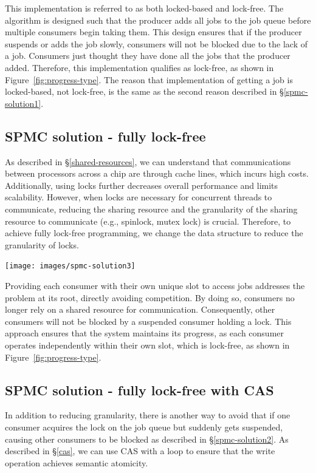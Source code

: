 \documentclass[fontsize=10pt, oneside]{scrartcl}
\newcommand{\fig}[1]{Figure~\ref{#1}}
\newcommand{\secref}[1]{\hyperref[#1]{\textsc{\S}\ref*{#1}}}
\begin{document}
This implementation is referred to as both locked-based and lock-free. 
The algorithm is designed such that the producer adds all jobs to the job queue before multiple consumers begin taking them. 
This design ensures that if the producer suspends or adds the job slowly, 
consumers will not be blocked due to the lack of a job. 
Consumers just thought they have done all the jobs that the producer added.
Therefore, this implementation qualifies as lock-free, as shown in \fig{fig:progress-type}.
The reason that implementation of getting a job is locked-based, not lock-free,  
is the same as the second reason described in \secref{spmc-solution1}.

\subsection{SPMC solution - fully lock-free}
\label{spmc-solution3}
As described in \secref{shared-resources}, 
we can understand that communications between processors across a chip are through cache lines, 
which incurs high costs. Additionally, using locks further decreases overall performance and limits scalability.
However, when locks are necessary for concurrent threads to communicate, 
reducing the sharing resource and the granularity of the sharing resource to communicate (e.g., spinlock, mutex lock) is crucial.
Therefore, to achieve fully lock-free programming, we change the data structure to reduce the granularity of locks.

\texttt{[image: images/spmc-solution3]}
\label{fig:spmc-solution3}

Providing each consumer with their own unique slot to access jobs addresses the problem at its root, 
directly avoiding competition. 
By doing so, consumers no longer rely on a shared resource for communication.
Consequently, other consumers will not be blocked by a suspended consumer holding a lock.
This approach ensures that the system maintains its progress, 
as each consumer operates independently within their own slot, 
which is lock-free, as shown in \fig{fig:progress-type}.

\subsection{SPMC solution - fully lock-free with CAS}
\label{SPMC-solution4}
In addition to reducing granularity, 
there is another way to avoid that if one consumer acquires the lock on the job queue but suddenly gets suspended, 
causing other consumers to be blocked as described in \secref{spmc-solution2}. 
As described in \secref{cas}, we can use \textsc{CAS} with a loop to ensure that the write operation achieves semantic atomicity.
\end{document}
